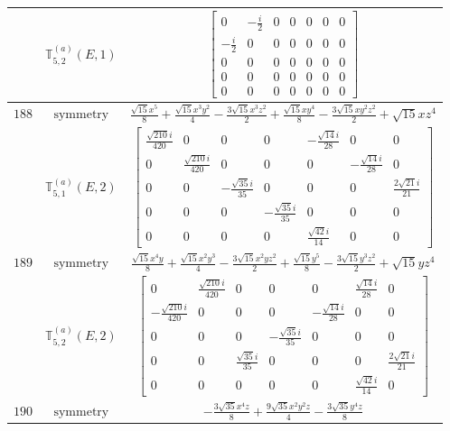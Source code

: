 \documentclass[fleqn,8pt,landscape]{jsarticle}
\begin{document}
\begin{longtable}{ccc}
$  $ & $ \mathbb{T}_{5,2}^{(a)}(E,1) $ & $ \begin{bmatrix} 0 & - \frac{i}{2} & 0 & 0 & 0 & 0 & 0 \\ - \frac{i}{2} & 0 & 0 & 0 & 0 & 0 & 0 \\ 0 & 0 & 0 & 0 & 0 & 0 & 0 \\ 0 & 0 & 0 & 0 & 0 & 0 & 0 \\ 0 & 0 & 0 & 0 & 0 & 0 & 0 \end{bmatrix} $ \\ \hline
$ 188 $ & $ \text{symmetry} $ & $ \frac{\sqrt{15} x^{5}}{8} + \frac{\sqrt{15} x^{3} y^{2}}{4} - \frac{3 \sqrt{15} x^{3} z^{2}}{2} + \frac{\sqrt{15} x y^{4}}{8} - \frac{3 \sqrt{15} x y^{2} z^{2}}{2} + \sqrt{15} x z^{4} $ \\
$  $ & $ \mathbb{T}_{5,1}^{(a)}(E,2) $ & $ \begin{bmatrix} \frac{\sqrt{210} i}{420} & 0 & 0 & 0 & - \frac{\sqrt{14} i}{28} & 0 & 0 \\ 0 & \frac{\sqrt{210} i}{420} & 0 & 0 & 0 & - \frac{\sqrt{14} i}{28} & 0 \\ 0 & 0 & - \frac{\sqrt{35} i}{35} & 0 & 0 & 0 & \frac{2 \sqrt{21} i}{21} \\ 0 & 0 & 0 & - \frac{\sqrt{35} i}{35} & 0 & 0 & 0 \\ 0 & 0 & 0 & 0 & \frac{\sqrt{42} i}{14} & 0 & 0 \end{bmatrix} $ \\ \hline
$ 189 $ & $ \text{symmetry} $ & $ \frac{\sqrt{15} x^{4} y}{8} + \frac{\sqrt{15} x^{2} y^{3}}{4} - \frac{3 \sqrt{15} x^{2} y z^{2}}{2} + \frac{\sqrt{15} y^{5}}{8} - \frac{3 \sqrt{15} y^{3} z^{2}}{2} + \sqrt{15} y z^{4} $ \\
$  $ & $ \mathbb{T}_{5,2}^{(a)}(E,2) $ & $ \begin{bmatrix} 0 & \frac{\sqrt{210} i}{420} & 0 & 0 & 0 & \frac{\sqrt{14} i}{28} & 0 \\ - \frac{\sqrt{210} i}{420} & 0 & 0 & 0 & - \frac{\sqrt{14} i}{28} & 0 & 0 \\ 0 & 0 & 0 & - \frac{\sqrt{35} i}{35} & 0 & 0 & 0 \\ 0 & 0 & \frac{\sqrt{35} i}{35} & 0 & 0 & 0 & \frac{2 \sqrt{21} i}{21} \\ 0 & 0 & 0 & 0 & 0 & \frac{\sqrt{42} i}{14} & 0 \end{bmatrix} $ \\ \hline
$ 190 $ & $ \text{symmetry} $ & $ - \frac{3 \sqrt{35} x^{4} z}{8} + \frac{9 \sqrt{35} x^{2} y^{2} z}{4} - \frac{3 \sqrt{35} y^{4} z}{8} $ \\

\end{longtable}
\end{document}
